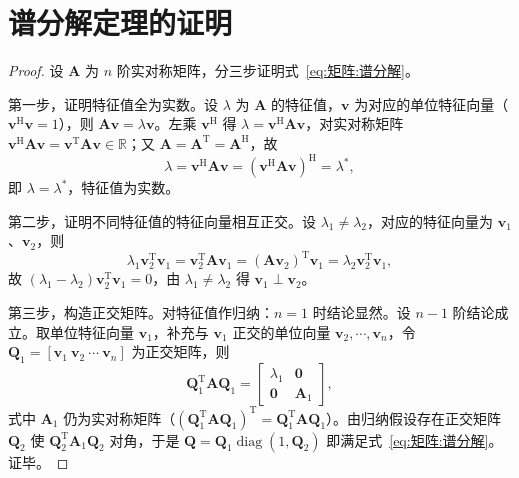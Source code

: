 
\section{谱分解定理的证明}
\label{sec:谱分解证明}

\begin{proof}
设 $\boldsymbol{A}$ 为 $n$ 阶实对称矩阵，分三步证明式~\eqref{eq:矩阵:谱分解}。

第一步，证明特征值全为实数。设 $\lambda$ 为 $\boldsymbol{A}$ 的特征值，$\boldsymbol{v}$ 为对应的单位特征向量（$\boldsymbol{v}^{\mathrm{H}}\boldsymbol{v} = 1$），则 $\boldsymbol{A}\boldsymbol{v} = \lambda\boldsymbol{v}$。左乘 $\boldsymbol{v}^{\mathrm{H}}$ 得 $\lambda = \boldsymbol{v}^{\mathrm{H}}\boldsymbol{A}\boldsymbol{v}$，对实对称矩阵 $\boldsymbol{v}^{\mathrm{H}}\boldsymbol{A}\boldsymbol{v} = \boldsymbol{v}^{\mathrm{T}}\boldsymbol{A}\boldsymbol{v}\in\mathbb{R}$；又 $\boldsymbol{A} = \boldsymbol{A}^{\mathrm{T}} = \boldsymbol{A}^{\mathrm{H}}$，故
\[
\lambda = \boldsymbol{v}^{\mathrm{H}}\boldsymbol{A}\boldsymbol{v} = (\boldsymbol{v}^{\mathrm{H}}\boldsymbol{A}\boldsymbol{v})^{\mathrm{H}} = \lambda^{*},
\]
即 $\lambda = \lambda^{*}$，特征值为实数。

第二步，证明不同特征值的特征向量相互正交。设 $\lambda_1\neq\lambda_2$，对应的特征向量为 $\boldsymbol{v}_1$、$\boldsymbol{v}_2$，则
\[
\lambda_1\boldsymbol{v}_2^{\mathrm{T}}\boldsymbol{v}_1 = \boldsymbol{v}_2^{\mathrm{T}}\boldsymbol{A}\boldsymbol{v}_1 = (\boldsymbol{A}\boldsymbol{v}_2)^{\mathrm{T}}\boldsymbol{v}_1 = \lambda_2\boldsymbol{v}_2^{\mathrm{T}}\boldsymbol{v}_1,
\]
故 $(\lambda_1-\lambda_2)\boldsymbol{v}_2^{\mathrm{T}}\boldsymbol{v}_1 = 0$，由 $\lambda_1\neq\lambda_2$ 得 $\boldsymbol{v}_1\perp\boldsymbol{v}_2$。

第三步，构造正交矩阵。对特征值作归纳：$n=1$ 时结论显然。设 $n-1$ 阶结论成立。取单位特征向量 $\boldsymbol{v}_1$，补充与 $\boldsymbol{v}_1$ 正交的单位向量 $\boldsymbol{v}_2,\cdots,\boldsymbol{v}_n$，令 $\boldsymbol{Q}_1 = [\boldsymbol{v}_1\ \boldsymbol{v}_2\ \cdots\ \boldsymbol{v}_n]$ 为正交矩阵，则
\[
\boldsymbol{Q}_1^{\mathrm{T}}\boldsymbol{A}\boldsymbol{Q}_1 = \begin{bmatrix} \lambda_1 & \boldsymbol{0} \\ \boldsymbol{0} & \boldsymbol{A}_1 \end{bmatrix},
\]
式中 $\boldsymbol{A}_1$ 仍为实对称矩阵（$(\boldsymbol{Q}_1^{\mathrm{T}}\boldsymbol{A}\boldsymbol{Q}_1)^{\mathrm{T}} = \boldsymbol{Q}_1^{\mathrm{T}}\boldsymbol{A}\boldsymbol{Q}_1$）。由归纳假设存在正交矩阵 $\boldsymbol{Q}_2$ 使 $\boldsymbol{Q}_2^{\mathrm{T}}\boldsymbol{A}_1\boldsymbol{Q}_2$ 对角，于是 $\boldsymbol{Q} = \boldsymbol{Q}_1\operatorname{diag}(1,\boldsymbol{Q}_2)$ 即满足式~\eqref{eq:矩阵:谱分解}。证毕。
\end{proof}

